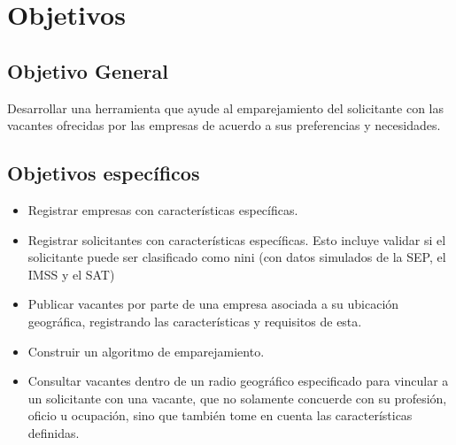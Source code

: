 \section{Objetivos}
\newpage
\subsection{Objetivo General}
Desarrollar una herramienta que ayude al emparejamiento del solicitante con las vacantes ofrecidas por las empresas de acuerdo a sus preferencias y necesidades. 

\subsection{Objetivos específicos}
\begin{itemize}
 \item Registrar empresas con características específicas. 
 \item Registrar solicitantes con características específicas. Esto incluye validar si el solicitante puede ser clasificado como nini (con datos simulados de la SEP, el IMSS y el SAT)
 \item Publicar vacantes por parte de una empresa asociada a su ubicación geográfica, registrando las características y requisitos de esta. 
 \item Construir un algoritmo de emparejamiento.
  \item Consultar vacantes dentro de un radio geográfico especificado para vincular a un solicitante con una vacante, que no solamente concuerde con su profesión, oficio u ocupación, sino que también tome en cuenta las características definidas. 
\end{itemize}

\bigskip
